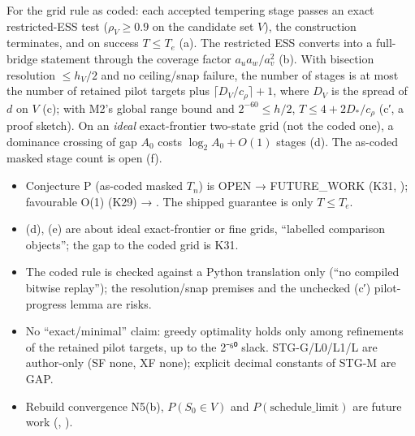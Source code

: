 \begin{plain}
For the grid rule as coded: each accepted tempering stage passes an exact restricted-ESS test ($\rho_V\ge0.9$ on the candidate set $V$), the construction terminates, and on success $T\le T_e$ (a). The restricted ESS converts into a full-bridge statement through the coverage factor $a_ua_w/a_v^2$ (b). With bisection resolution $\le h_V/2$ and no ceiling/snap failure, the number of stages is at most the number of retained pilot targets plus $\lceil D_V/c_{\rho}\rceil+1$, where $D_V$ is the spread of $d$ on $V$ (c); with M2's global range bound and $2^{-60}\le h/2$, $T\le4+2D_{*}/c_{\rho}$ (c′, a proof sketch). On an \emph{ideal} exact-frontier two-state grid (not the coded one), a dominance crossing of gap $A_0$ costs $\log_2A_0+O(1)$ stages (d). The as-coded masked stage count is open (f).
\end{plain}

\begin{notproved}
\begin{itemize}
\item Conjecture P (as-coded masked $T_n$) is OPEN → FUTURE\_WORK (K31, ); favourable O(1) (K29) → . The shipped guarantee is only $T\le T_e$.
\item (d), (e) are about ideal exact-frontier or fine grids, ``labelled comparison objects''; the gap to the coded grid is K31.
\item The coded rule is checked against a Python translation only (``no compiled bitwise replay''); the resolution/snap premises and the unchecked (c′) pilot-progress lemma are risks.
\item No ``exact/minimal'' claim: greedy optimality holds only among refinements of the retained pilot targets, up to the 2⁻⁶⁰ slack. STG-G/L0/L1/L are author-only (SF none, XF none); explicit decimal constants of STG-M are GAP.
\item Rebuild convergence N5(b), $P(S_0\in V)$ and $P(\text{schedule\_limit})$ are future work (, ).
\end{itemize}
\end{notproved}


